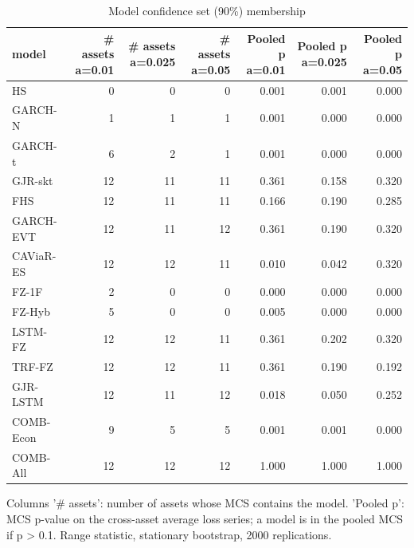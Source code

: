 \begin{table}[htbp]
\centering
\footnotesize
\caption{Model confidence set (90\%) membership}
\label{tab:mcs}
\begin{tabular}{lrrrrrr}
\toprule
model & \# assets a=0.01 & \# assets a=0.025 & \# assets a=0.05 & Pooled p a=0.01 & Pooled p a=0.025 & Pooled p a=0.05 \\
\midrule
HS & 0 & 0 & 0 & 0.001 & 0.001 & 0.000 \\
GARCH-N & 1 & 1 & 1 & 0.001 & 0.000 & 0.000 \\
GARCH-t & 6 & 2 & 1 & 0.001 & 0.000 & 0.000 \\
GJR-skt & 12 & 11 & 11 & 0.361 & 0.158 & 0.320 \\
FHS & 12 & 11 & 11 & 0.166 & 0.190 & 0.285 \\
GARCH-EVT & 12 & 11 & 12 & 0.361 & 0.190 & 0.320 \\
CAViaR-ES & 12 & 12 & 11 & 0.010 & 0.042 & 0.320 \\
FZ-1F & 2 & 0 & 0 & 0.000 & 0.000 & 0.000 \\
FZ-Hyb & 5 & 0 & 0 & 0.005 & 0.000 & 0.000 \\
LSTM-FZ & 12 & 12 & 11 & 0.361 & 0.202 & 0.320 \\
TRF-FZ & 12 & 12 & 11 & 0.361 & 0.190 & 0.192 \\
GJR-LSTM & 12 & 11 & 12 & 0.018 & 0.050 & 0.252 \\
COMB-Econ & 9 & 5 & 5 & 0.001 & 0.001 & 0.000 \\
COMB-All & 12 & 12 & 12 & 1.000 & 1.000 & 1.000 \\
\bottomrule
\end{tabular}
\par\smallskip\parbox{\linewidth}{\scriptsize Columns '\# assets': number of assets whose MCS contains the model. 'Pooled p': MCS p-value on the cross-asset average loss series; a model is in the pooled MCS if p > 0.1. Range statistic, stationary bootstrap, 2000 replications.}
\end{table}